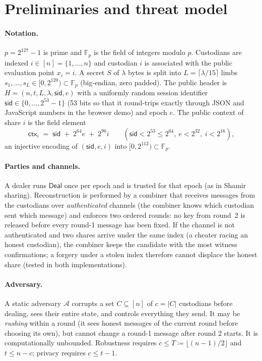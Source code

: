 \documentclass[11pt,a4paper]{article}
\theoremstyle{plain}
\theoremstyle{definition}
\newcommand{\F}{\mathbb{F}_p}
\newcommand{\ctx}{\mathsf{ctx}}
\providecommand{\adv}{\mathcal{A}}
\begin{document}
\section{Preliminaries and threat model}\label{sec:prelim}

\paragraph{Notation.} $p=2^{127}-1$ is prime and $\F$ is the field of integers modulo $p$. Custodians
are indexed $i\in[n]=\{1,\dots,n\}$ and custodian $i$ is associated with the public evaluation
point $x_i=i$. A secret $S$ of $\lambda$ bytes is split into $L=\lceil\lambda/15\rceil$ limbs
$s_1,\dots,s_L\in[0,2^{120})\subset\F$ (big-endian, zero padded). The public header is
$H=(n,t,L,\lambda,\mathsf{sid},e)$ with a uniformly random session identifier $\mathsf{sid}\in\{0,\dots,2^{53}-1\}$ (53 bits so that it round-trips exactly through JSON and JavaScript numbers in the browser demo) and epoch
$e$. The public context of share $i$ is the field element
\[
  \ctx_i \;=\; \mathsf{sid} \;+\; 2^{64}e \;+\; 2^{96} i \qquad (\mathsf{sid}<2^{53}\le 2^{64},\ e<2^{32},\ i<2^{16}),
\]
an injective encoding of $(\mathsf{sid},e,i)$ into $[0,2^{112})\subset\F$.

\paragraph{Parties and channels.} A dealer runs $\mathsf{Deal}$ once per epoch and is trusted for that
epoch (as in Shamir sharing). Reconstruction is performed by a combiner that receives messages from
the custodians over \emph{authenticated} channels (the combiner knows which custodian sent which
message) and enforces two ordered rounds: no key from round~2 is released before every round-1
message has been fixed. If the channel is not authenticated and two shares arrive under the same
index (a cheater racing an honest custodian), the combiner keeps the candidate with the most witness
confirmations; a forgery under a stolen index therefore cannot displace the honest share (tested in
both implementations).

\paragraph{Adversary.} A static adversary $\adv$ corrupts a set $C\subseteq[n]$ of $c=|C|$
custodians before dealing, sees their entire state, and controls everything they send. It may be
\emph{rushing} within a round (it sees honest messages of the current round before choosing its
own), but cannot change a round-1 message after round 2 starts. It is computationally unbounded.
Robustness requires $c\le T\coloneqq\lfloor (n-1)/2\rfloor$ and $t\le n-c$; privacy requires
$c\le t-1$.
\end{document}
